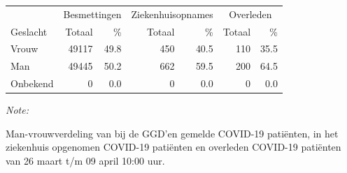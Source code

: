 \documentclass[
  english,
  man,floatsintext]{apa6}
\begin{document}
\begin{table}
\centering\begingroup\fontsize{11}{13}\selectfont

\begin{threeparttable}
\begin{tabular}{lrrrrrr}
\toprule
\multicolumn{1}{c}{ } & \multicolumn{2}{c}{Besmettingen} & \multicolumn{2}{c}{Ziekenhuisopnames} & \multicolumn{2}{c}{Overleden} \\
\cmidrule(l{3pt}r{3pt}){2-3} \cmidrule(l{3pt}r{3pt}){4-5} \cmidrule(l{3pt}r{3pt}){6-7}
Geslacht & Totaal & \% & Totaal & \% & Totaal & \%\\
\midrule
Vrouw & 49117 & 49.8 & 450 & 40.5 & 110 & 35.5\\
Man & 49445 & 50.2 & 662 & 59.5 & 200 & 64.5\\
Onbekend & 0 & 0.0 & 0 & 0.0 & 0 & 0.0\\
\bottomrule
\end{tabular}
\begin{tablenotes}
\item \textit{Note: } 
\item Man-vrouwverdeling van bij de GGD’en gemelde COVID-19 patiënten, in het ziekenhuis opgenomen COVID-19 patiënten en overleden COVID-19 patiënten van 26 maart t/m 09 april 10:00 uur.
\end{tablenotes}
\end{threeparttable}
\endgroup{}
\end{table}
\newpage
\end{document}
